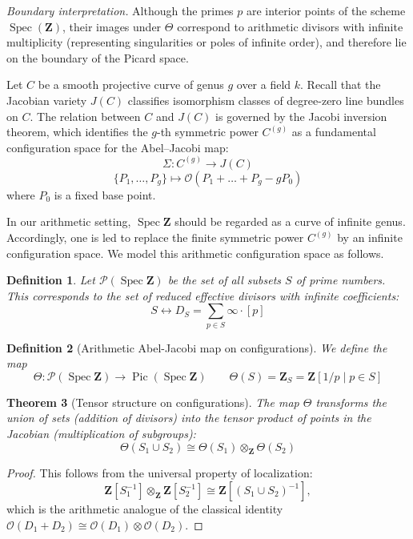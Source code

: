 \documentclass[11pt,a4paper]{article}
\newcommand{\Z}{\mathbf{Z}}
\def\spz{\Spec \Z}
\newcommand{\Spec}{\operatorname{Spec}}
\def\Pic{\operatorname{Pic}}
\def\spz{\Spec \Z}
\theoremstyle{plain}
\newtheorem{thm}{Theorem}[section]
\newtheorem{defn}[thm]{Definition}
\theoremstyle{definition} %
\begin{document}
\emph{Boundary interpretation.}
Although the primes $p$ are interior points of the scheme $\Spec(\Z)$,
their images under $\Theta$ correspond to arithmetic divisors with infinite
multiplicity (representing singularities or poles of infinite order), and therefore lie on the boundary of the Picard space.\vspace{.05in}



Let $C$ be a smooth projective curve of genus $g$ over a field $k$.
Recall that the Jacobian variety $J(C)$ classifies isomorphism classes of degree-zero line bundles on $C$.
The relation between $C$ and $J(C)$ is governed by the Jacobi inversion theorem,
which identifies the $g$-th symmetric power $C^{(g)}$ as a fundamental configuration space
for the Abel--Jacobi map:
\[
\Sigma: C^{(g)} \longrightarrow J(C)
\]
\[
\{P_1, \dots, P_g\} \longmapsto \mathcal{O}(P_1 + \dots + P_g - g P_0)
\]
where $P_0$ is a fixed base point.

In our arithmetic setting, $\spz$ should be regarded as a curve of infinite genus.
Accordingly, one is led to replace the finite symmetric power $C^{(g)}$
by an infinite configuration space.
We model this arithmetic configuration space as follows.

\begin{defn}
Let $\mathcal{P}(\Spec \Z)$ be the set of all subsets $S$ of prime numbers. This corresponds to the set of reduced effective divisors with infinite coefficients:
\[
S \longleftrightarrow D_S = \sum_{p \in S} \infty \cdot [p]
\]
\end{defn}

\begin{defn}[Arithmetic Abel-Jacobi map on configurations]
We define the map $$\Theta: \mathcal{P}(\Spec \Z) \to \Pic(\spz)\qquad 
\Theta(S) = \Z_S = \Z[1/p \mid p \in S]
$$
\end{defn}








\begin{thm}[Tensor structure on configurations]
The map $\Theta$ transforms the union of sets (addition of divisors) into the tensor product of points in the Jacobian (multiplication of subgroups):
\[
\Theta(S_1 \cup S_2) \cong \Theta(S_1) \otimes_\Z \Theta(S_2)
\]
\end{thm}

\begin{proof}
This follows from the universal property of localization:
\[
\Z[S_1^{-1}] \otimes_\Z \Z[S_2^{-1}]
\cong
\Z[(S_1 \cup S_2)^{-1}],
\]
which is the arithmetic analogue of the classical identity
$\mathcal O(D_1+D_2)\cong \mathcal O(D_1)\otimes\mathcal O(D_2)$.
\end{proof}
\end{document}
